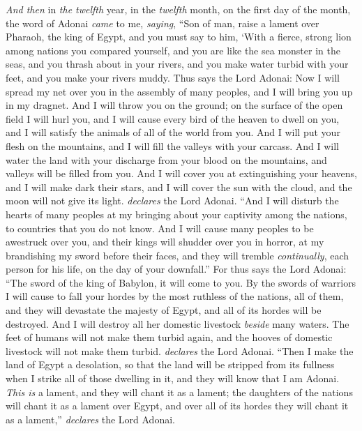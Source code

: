 \begin{biblechapter} %
 \textit{And then} in \textit{the twelfth} year, in the \textit{twelfth} month, on the first day of the month, the word of Adonai \textit{came} to me, \textit{saying},
\verse “Son of man, raise a lament over Pharaoh, the king of Egypt, and you must say to him, ‘With a fierce, strong lion among nations you compared yourself, 
and you are like the sea monster in the seas, 
and you thrash about in your rivers, 
and you make water turbid with your feet, 
and you make your rivers muddy.
\verse Thus says the Lord Adonai:
\verse Now I will spread my net over you 
in the assembly of many peoples, 
and I will bring you up in my dragnet.
\verse And I will throw you on the ground; 
on the surface of the open field I will hurl you, 
and I will cause every bird of the heaven to dwell on you, 
and I will satisfy the animals of all of the world from you.
\verse And I will put your flesh on the mountains, 
and I will fill the valleys with your carcass.
\verse And I will water the land with your discharge from your blood 
on the mountains, 
and valleys will be filled from you.
\verse And I will cover you at extinguishing your heavens, 
and I will make dark their stars, 
and I will cover the sun with the cloud, 
and the moon will not give its light. \textit{declares} the Lord Adonai.
\verse “And I will disturb the hearts of many peoples 
at my bringing about your captivity among the nations, 
to countries that you do not know.
\verse And I will cause many peoples to be awestruck over you, 
and their kings will shudder over you in horror, 
at my brandishing my sword before their faces, 
and they will tremble \textit{continually}, 
each person for his life, 
on the day of your downfall.”
\verse For thus says the Lord Adonai:
\verse “The sword of the king of Babylon, 
it will come to you.
\verse By the swords of warriors I will cause to fall your hordes 
by the most ruthless of the nations, all of them, 
and they will devastate the majesty of Egypt, 
and all of its hordes will be destroyed.
\verse And I will destroy all her domestic livestock 
\textit{beside} many waters. 
The feet of humans will not make them turbid again, 
and the hooves of domestic livestock will not make them turbid. \textit{declares} the Lord Adonai.
\verse “Then I make the land of Egypt a desolation, 
so that the land will be stripped from its fullness 
when I strike all of those dwelling in it, 
and they will know that I am Adonai.
\verse \textit{This is} a lament, and they will chant it as a lament; the daughters of the nations will chant it as a lament over Egypt, and over all of its hordes they will chant it as a lament,” \textit{declares} the Lord Adonai.

\end{biblechapter}
